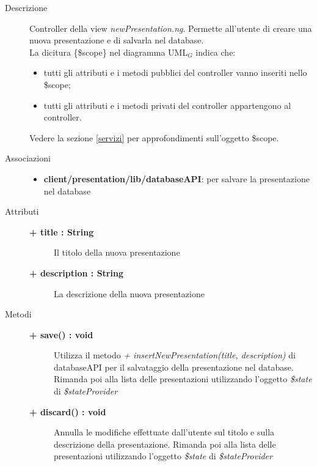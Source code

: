 \begin{description}
\item[Descrizione] \hfill
	Controller della view \textit{newPresentation.ng}. Permette all'utente di creare una nuova presentazione e di salvarla nel database.
	\\ La dicitura \{\$scope\} nel diagramma UML$_G$ indica che:
\begin{itemize}
\item tutti gli attributi e i metodi pubblici del controller vanno inseriti nello \$scope;
\item tutti gli attributi e i metodi privati del controller appartengono al controller.
\end{itemize}
Vedere la sezione \ref{servizi} per approfondimenti sull'oggetto \$scope.
	

\item[Associazioni] \hfill
	\begin{itemize}
		\item \textbf{client/presentation/lib/databaseAPI}: per salvare la presentazione nel database
	\end{itemize}

	
\item[Attributi] \hfill
	\begin{description}
		\item[\textbf{+ title : String			}] \hfill
		Il titolo della nuova presentazione
		\item[\textbf{+ description : String			}] \hfill	
		La descrizione della nuova presentazione
	\end{description}
	
	
\item[Metodi] \hfill

	\begin{description}
		\item[\textbf{\color{blue}+ save() : void			}] \hfill
			Utilizza il metodo \textit{+ insertNewPresentation(title, description)} di databaseAPI per il salvataggio della presentazione nel database. Rimanda poi alla lista delle presentazioni utilizzando l'oggetto \textit{\$state} di \textit{\$stateProvider}
	\end{description}
	
	\begin{description}
		\item[\textbf{\color{blue}+ discard() : void			}] \hfill
			Annulla le modifiche effettuate dall'utente sul titolo e sulla descrizione della presentazione. Rimanda poi alla lista delle presentazioni utilizzando l'oggetto \textit{\$state} di \textit{\$stateProvider}
	\end{description}
	
	
	
\end{description}




